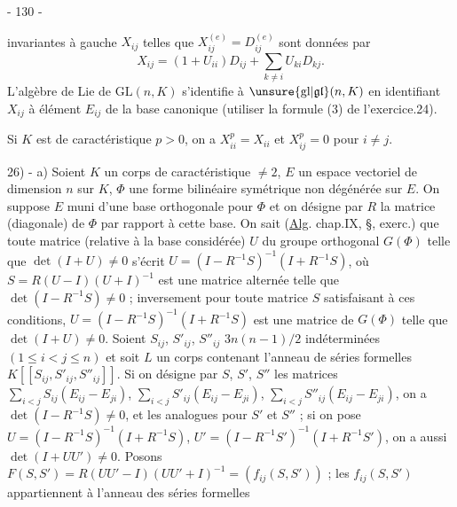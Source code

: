 \begin{center}- 130 -\end{center}

invariantes à gauche $X_{ij}$ telles que $X_{ij}^{(e)}=D_{ij}^{(e)}$ sont données par
\[
X_{ij}=(1+U_{ii})D_{ij}+\sum_{k\ne i}U_{ki}D_{kj}.
\]
L'algèbre de Lie de $\mathrm{GL}(n,K)$ s'identifie à $\unsure{\mathrm{gl}|\mathfrak{gl}}(n,K)$ en identifiant $X_{ij}$ à élément $E_{ij}$ de la base canonique (utiliser la formule (3) de l'exercice.24).

Si $K$ est de caractéristique $p>0$, on a $X_{ii}^p=X_{ii}$ et $X_{ij}^p=0$ pour $i\ne j$.

\margin{\P}
26) - a) Soient $K$ un corps de caractéristique $\ne2$, $E$ un espace vectoriel de dimension $n$ sur $K$, $\Phi$ une forme bilinéaire symétrique non dégénérée sur $E$. On suppose $E$ muni d'une base orthogonale pour $\Phi$ et on désigne par $R$ la matrice (diagonale) de $\Phi$ par rapport à cette base. On sait (\uline{Alg}. chap.IX, \S\quad, exerc.\quad) que toute matrice (relative à la base considérée) $U$ du groupe orthogonal $G(\Phi)$ telle que $\det(I+U)\ne0$ s'écrit $U=(I-R^{-1}S)^{-1}(I+R^{-1}S)$, où $S=R(U-I)(U+I)^{-1}$ est une matrice alternée telle que $\det(I-R^{-1}S)\ne0$ ; inversement pour toute matrice $S$ satisfaisant à ces conditions, $U=(I-R^{-1}S)^{-1}(I+R^{-1}S)$ est une matrice de $G(\Phi)$ telle que $\det(I+U)\ne0$. Soient $S_{ij}$, $S'_{ij}$, $S''_{ij}$ $3n(n-1)/2$ indéterminées $(1\leq i<j\leq n)$ et soit $L$ un corps contenant l'anneau de séries formelles $K[[S_{ij},S'_{ij},S''_{ij}]]$. Si on désigne par $S$, $S'$, $S''$ les matrices $\sum_{i<j}S_{ij}(E_{ij}-E_{ji})$, $\sum_{i<j}S'_{ij}(E_{ij}-E_{ji})$, $\sum_{i<j}S''_{ij}(E_{ij}-E_{ji})$, on a $\det(I-R^{-1}S)\ne0$, et les analogues pour $S'$ et $S''$ ; si on pose $U=(I-R^{-1}S)^{-1}(I+R^{-1}S)$, $U'=(I-R^{-1}S')^{-1}(I+R^{-1}S')$, on a aussi $\det(I+UU')\ne0$. Posons $F(S,S')=R(UU'-I)(UU'+I)^{-1}=(f_{ij}(S,S'))$ ; les $f_{ij}(S,S')$ appartiennent à l'anneau des séries formelles
